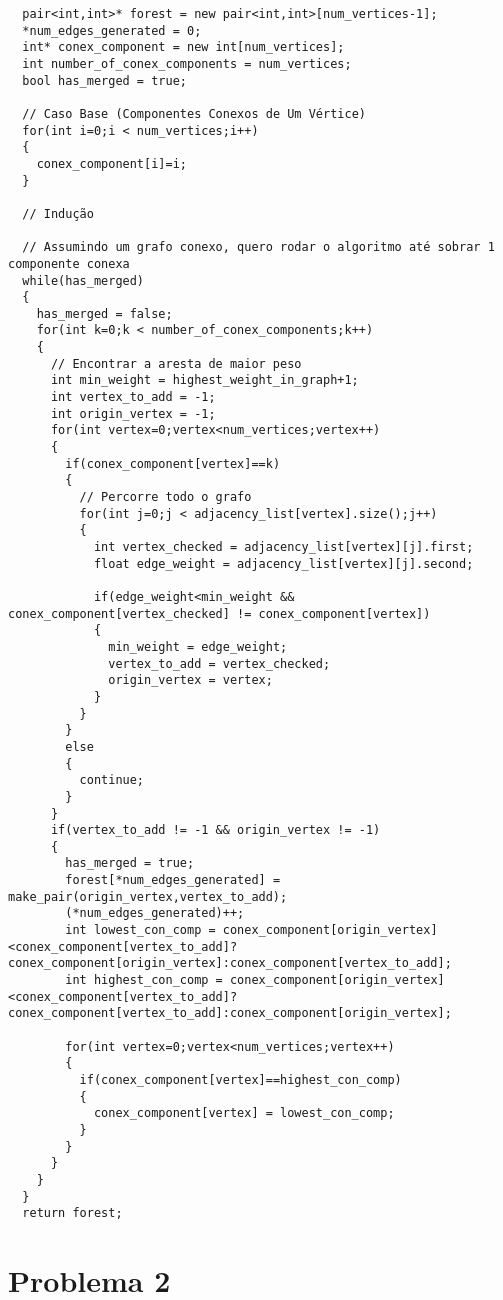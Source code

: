 \documentclass[12pt]{article}
\begin{document}
\begin{lstlisting}
  pair<int,int>* forest = new pair<int,int>[num_vertices-1];
  *num_edges_generated = 0;
  int* conex_component = new int[num_vertices];
  int number_of_conex_components = num_vertices;
  bool has_merged = true;

  // Caso Base (Componentes Conexos de Um Vértice)
  for(int i=0;i < num_vertices;i++)
  {
    conex_component[i]=i;
  }

  // Indução

  // Assumindo um grafo conexo, quero rodar o algoritmo até sobrar 1 componente conexa
  while(has_merged)
  {
    has_merged = false;
    for(int k=0;k < number_of_conex_components;k++)
    {
      // Encontrar a aresta de maior peso
      int min_weight = highest_weight_in_graph+1;
      int vertex_to_add = -1;
      int origin_vertex = -1;
      for(int vertex=0;vertex<num_vertices;vertex++)
      {
        if(conex_component[vertex]==k)
        {
          // Percorre todo o grafo
          for(int j=0;j < adjacency_list[vertex].size();j++)
          {
            int vertex_checked = adjacency_list[vertex][j].first;
            float edge_weight = adjacency_list[vertex][j].second;

            if(edge_weight<min_weight && conex_component[vertex_checked] != conex_component[vertex])
            {
              min_weight = edge_weight;
              vertex_to_add = vertex_checked;
              origin_vertex = vertex;
            }
          }
        }
        else
        {
          continue;
        }
      }
      if(vertex_to_add != -1 && origin_vertex != -1)
      {
        has_merged = true;
        forest[*num_edges_generated] = make_pair(origin_vertex,vertex_to_add);
        (*num_edges_generated)++;
        int lowest_con_comp = conex_component[origin_vertex]<conex_component[vertex_to_add]?conex_component[origin_vertex]:conex_component[vertex_to_add];
        int highest_con_comp = conex_component[origin_vertex]<conex_component[vertex_to_add]?conex_component[vertex_to_add]:conex_component[origin_vertex];

        for(int vertex=0;vertex<num_vertices;vertex++)
        {
          if(conex_component[vertex]==highest_con_comp)
          {
            conex_component[vertex] = lowest_con_comp;
          }
        }
      }
    }
  }
  return forest;
\end{lstlisting}

\section{Problema 2}
\end{document}
